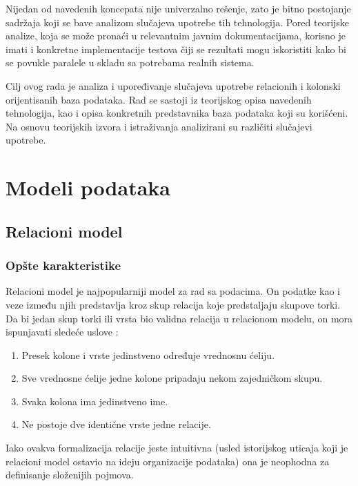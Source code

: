 \documentclass[12pt,oneside]{memoir}
\begin{document}
Nijedan od navedenih koncepata nije univerzalno rešenje, zato je bitno postojanje sadržaja koji se bave analizom slučajeva upotrebe tih tehnologija. Pored teorijske analize, koja se može pronaći u relevantnim javnim dokumentacijama, korisno je imati i konkretne implementacije testova čiji se rezultati mogu iskoristiti kako bi se povukle paralele u skladu sa potrebama realnih  sistema. 

Cilj ovog rada je analiza i upoređivanje slučajeva upotrebe relacionih i kolonski orijentisanih baza podataka. Rad se sastoji iz teorijskog opisa navedenih tehnologija, kao i opisa konkretnih predstavnika baza podataka koji su korišćeni. Na osnovu teorijskih izvora i istraživanja analizirani su  različiti slučajevi upotrebe. 


\chapter{Modeli podataka}
\label{chp:razrada}
\section{Relacioni model}
\subsection{Opšte karakteristike}
Relacioni model je najpopularniji model za rad sa podacima. On podatke kao i veze između njih predstavlja kroz skup relacija koje predstaljaju skupove torki. Da bi jedan skup torki ili vrsta bio validna relacija u relacionom modelu, on mora ispunjavati sledeće uslove \cite{ColumnarOriented}:

\begin{enumerate}
\item[\textbullet] Presek kolone i vrste jedinstveno određuje vrednosnu ćeliju.

\item[\textbullet] Sve vrednosne ćelije jedne kolone pripadaju nekom zajedničkom skupu. 

\item[\textbullet] Svaka kolona ima jedinstveno ime.

\item[\textbullet] Ne postoje dve identične vrste jedne relacije. 
\end{enumerate}

Iako ovakva formalizacija relacije jeste intuitivna (usled istorijskog uticaja koji je relacioni model ostavio na ideju organizacije podataka) ona je neophodna za  definisanje složenijih pojmova. 
\end{document}
